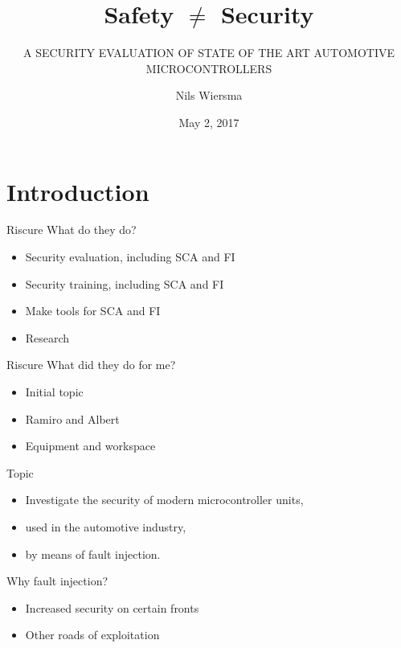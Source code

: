 \documentclass[table]{beamer}
\title{Safety $\neq$ Security}
\subtitle{A SECURITY EVALUATION OF STATE OF THE ART AUTOMOTIVE MICROCONTROLLERS}
\date{May 2, 2017}
\author{Nils Wiersma}
\begin{document}
\begin{frame}
    \titlepage
\end{frame}

\begin{frame}
    \tableofcontents
\end{frame}

\section{Introduction}

\begin{frame}
    \tableofcontents[currentsection]
\end{frame}


\begin{frame}{Riscure}
    What do they do?
    \begin{itemize}
        \item Security evaluation, including SCA and FI
        \item Security training, including SCA and FI
        \item Make tools for SCA and FI
        \item Research
    \end{itemize}
\end{frame}

\begin{frame}{Riscure}
    What did they do for me?
    \begin{itemize}
        \item Initial topic
        \item Ramiro and Albert
        \item Equipment and workspace
    \end{itemize}
\end{frame}

\begin{frame}{Topic}
    \begin{itemize}
        \item Investigate the security of modern microcontroller units, 
            \item[] used in the automotive industry, 
            \item[] by means of fault injection.
    \end{itemize}

\end{frame}

\begin{frame}{Why fault injection?}
    \begin{itemize}
        \item Increased security on certain fronts
        \item Other roads of exploitation
    \end{itemize}
\end{frame}
\end{document}
